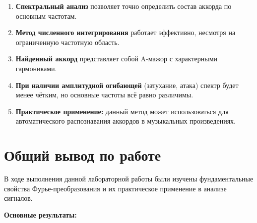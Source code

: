 \begin{enumerate}
    \item \textbf{Спектральный анализ} позволяет точно определить состав аккорда по основным частотам.
    
    \item \textbf{Метод численного интегрирования} работает эффективно, несмотря на ограниченную частотную область.
    
    \item \textbf{Найденный аккорд} представляет собой A-мажор с характерными гармониками.
    
    \item \textbf{При наличии амплитудной огибающей} (затухание, атака) спектр будет менее чётким, но основные частоты всё равно различимы.
    
    \item \textbf{Практическое применение:} данный метод может использоваться для автоматического распознавания аккордов в музыкальных произведениях.
\end{enumerate}

\section*{Общий вывод по работе}

В ходе выполнения данной лабораторной работы были изучены фундаментальные свойства Фурье-преобразования и их практическое применение в анализе сигналов.

\textbf{Основные результаты:}

